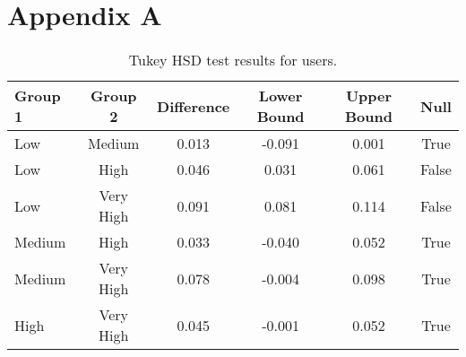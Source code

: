 
\chapter{Appendix A} %

\label{AppendixA} %

\begin{table}[htbp]
    \centering
    \begin{tabular}{lccccc}
        \toprule
        \textbf{Group 1} & \textbf{Group 2} & \textbf{Difference} & \textbf{Lower Bound} & \textbf{Upper Bound} & \textbf{Null} \\
        \midrule
        Low & Medium & 0.013 & -0.091 & 0.001 & True \\
        Low & High & 0.046 & 0.031 & 0.061 & False \\
        Low & Very High & 0.091 & 0.081 & 0.114 & False \\
        Medium & High & 0.033 & -0.040 & 0.052 & True \\
        Medium & Very High & 0.078 & -0.004 & 0.098 & True \\
        High & Very High & 0.045 & -0.001 & 0.052 & True \\
        \bottomrule
    \end{tabular}
    \caption{Tukey HSD test results for users.}
    \label{tab:tukey_hsd_user}
\end{table}



